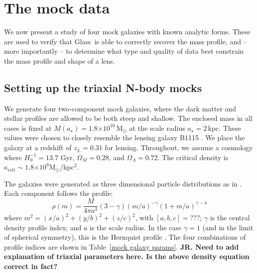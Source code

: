 \documentclass[galley,usenatbib]{mn2e}
\newcommand{\Glass}{{\sc Glass}}
\newcommand{\Msun}{\ensuremath{\mathrm{M}_\odot}}
\newcommand{\tabref}[1] {Table~\ref{#1}}
\newcommand{\e}[1]{\ensuremath{\times 10^{#1}}}
\begin{document}
\section{The mock data}\label{sec:mockdata}

We now present a study of four mock galaxies with known analytic forms. These are used to verify that \Glass\ is able to correctly recover the mass profile, and -- more importantly -- to determine what type and quality of data best constrain the mass profile and shape of a lens.

\subsection{Setting up the triaxial N-body mocks}

We generate four two-component mock galaxies, where the dark matter and stellar
profiles are allowed to be both steep and shallow.  The enclosed mass in all cases
is fixed at $M(a_\star)= 1.8\e{10}$\,M$_\odot$ at the scale radius $a_\star=2$\,kpc. These
values were chosen to closely resemble the lensing galaxy B1115 \citep{1980Natur.285..641W}. We place the galaxy at
a redshift of $z_L = 0.31$ for lensing.  Throughout, we assume a cosmology
where $H_0^{-1}=13.7$ Gyr, $\Omega_M=0.28$, and $\Omega_\Lambda=0.72$. The
critical density is $\kappa_\mathrm{crit}\sim 1.8\e{9}$\Msun/kpc$^2$.

The galaxies were generated as three dimensional particle distributions as in \citet{2009MNRAS.395.1079D}. Each component follows the profile:
\begin{equation}
\rho(m) = \frac{M}{4\pi a^3}(3-\gamma){(m/a)^{-\gamma}(1 + m/a)^{\gamma-4}}
\label{Dehnen profile}
\end{equation}
where $m^2 = (x/a)^2 + (y/b)^2 + (z/c)^2$, with $[a,b,c] = ???$; $\gamma$ is the central density profile index; and $a$ is the scale radius. In the
case $\gamma=1$ (and in the limit of spherical symmetry), this is the Hernquist profile \citep{1990ApJ...356..359H}.  The four combinations of
profile indices are shown in \tabref{mock galaxy params}. {\bf JR. Need to add explanation of triaxial parameters here. Is the above density equation correct in fact?} 
\end{document}
